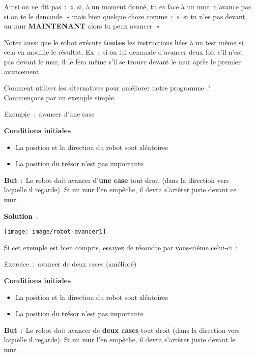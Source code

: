 	Ainsi on ne dit pas~:~«~si, à un moment donné, tu es face à un mur,
	n’avance pas si on te le demande~» mais bien quelque
	chose comme~:~«~si tu n’es pas devant un mur
	\textbf{MAINTENANT} alors tu peux avancer~»

	Notez aussi que le robot exécute \textbf{toutes} les instructions liées
	à un test même si cela en modifie le résultat. Ex~:~si on lui demande
	d’avancer deux fois s’il
	n’est pas devant le mur, il le fera même
	s’il se trouve devant le mur après le premier
	avancement.

	Comment utiliser les alternatives pour améliorer notre programme~?
	Commençons par un exemple simple.

	
	\begin{Emphase}[exercice]{Exemple~:~avancer d’une case}

		\textbf{Conditions initiales}

		\begin{itemize}
		\item La position et la direction du robot sont aléatoires
		\item La position du trésor n’est pas importante
		\end{itemize}
		
		\textbf{But}~:~Le robot doit avancer d’\textbf{une
		case} tout droit (dans la direction vers laquelle il regarde). 
		Si un mur l’en empêche, il devra s’arrêter juste devant ce mur.

		\textbf{Solution}~:~
		
		\texttt{[image: image/robot-avancer1]}

	\end{Emphase}
	
	Si cet exemple est bien compris, 
	essayez de résoudre par vous-même celui-ci~:

	
	\begin{Emphase}[exercice]{Exercice~:~avancer de deux cases (amélioré)}

		\textbf{Conditions initiales}

		\begin{itemize}
		\item La position et la direction du robot sont aléatoires
		\item La position du trésor n’est pas importante
		\end{itemize}
		
		\textbf{But}~:~Le robot doit avancer de \textbf{deux cases} tout droit
		(dans la direction vers laquelle il regarde). Si un mur
		l’en empêche, il devra s’arrêter
		juste devant le mur.

	\end{Emphase}


